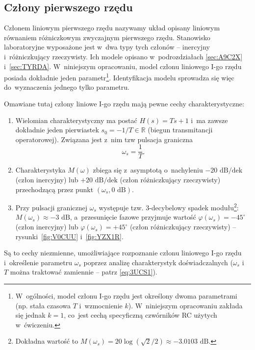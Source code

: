 \documentclass[paper=a4,DIV=12]{lpas}
\newcommand{\degree}{^{\circ}}
\begin{document}
\begin{appendices}
  \subsection{Człony pierwszego rzędu}
  \label{sec:LDB7J}

  Członem liniowym pierwszego rzędu nazywamy układ opisany liniowym równaniem
  różniczkowym zwyczajnym pierwszego rzędu. Stanowisko laboratoryjne wyposażone
  jest w~dwa typy tych członów -- inercyjny i~różniczkujący rzeczywisty. Ich
  modele opisano w~podrozdziałach \ref{sec:A9C2X} i~\ref{sec:TYRDA}.
  W~niniejszym opracowaniu, model członu liniowego I-go rzędu posiada dokładnie
  jeden parametr\footnote{W~ogólności, model członu I-go rzędu jest określony
  dwoma parametrami (np. stała czasowa $T$ i~wzmocnienie $k$). W~niniejszym
  opracowaniu zakłada się jednak $k=1$, co~jest cechą specyficzną czwórników RC
  użytych w~ćwiczeniu.}. Identyfikacja modelu sprowadza się więc do~wyznaczenia
  jednego tylko parametru.

  Omawiane tutaj człony liniowe I-go rzędu mają pewne cechy charakterystyczne:
  \begin{enumerate}
    \item Wielomian charakterystyczny ma postać $H(s) = Ts+1$ i~ma zawsze
      dokładnie jeden pierwiastek $s_0 = -1/T \in \mathbb{R}$ (biegun
      transmitancji operatorowej). Związana jest z~nim tzw pulsacja graniczna
      \begin{equation}
        \omega_s = \frac{1}{T}.
        \label{eq:3UCS1}
      \end{equation}
    \item Charakterystyka $M(\omega)$ zbiega się z~asymptotą o~nachyleniu
      $-20\text{ dB/dek}$ (człon inercyjny) lub $+20\text{ dB/dek}$ (człon
      różniczkujący rzeczywisty) przechodzącą przez punkt
      $(\omega_s,0\text{ dB})$.
    \item Przy pulsacji granicznej $\omega_s$ występuje tzw. 3-decybelowy spadek
      modułu\footnote{Dokładna wartość to $M(\omega_s) = 20 \log{(\sqrt{2}/2)}
      \approx -3.0103\text{ dB}$.}: $M(\omega_s) \approx -3\text{ dB}$,
      a~przesunięcie fazowe przyjmuje wartość $\varphi(\omega_s) = -45\degree$
      (człon inercyjny) lub $\varphi(\omega_s) = +45\degree$ (człon
      różniczkujący rzeczywisty) -- rysunki~\ref{fig:V0CUU} i~\ref{fig:YZX1R}.
  \end{enumerate}
  Są to cechy niezmienne, umożliwiające rozpoznanie członu liniowego I-go rzędu
  i~określenie parametru $\omega_s$ poprzez analizę charakterystyk
  doświadczalnych ($\omega_s$ i~$T$ można traktować zamiennie -- patrz \eqref{eq:3UCS1}).


\end{appendices}
\end{document}
